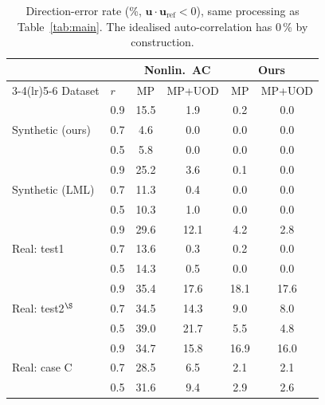 \begin{table}[t]
\centering
\caption{Direction-error rate (\%, $\mathbf{u}\cdot\mathbf{u}_\mathrm{ref}<0$), same processing as Table~\ref{tab:main}. The idealised auto-correlation has 0\,\% by construction.}
\label{tab:direction}
\small
\begin{tabular}{llcccc}
\toprule
 & & \multicolumn{2}{c}{Nonlin.\ AC} & \multicolumn{2}{c}{Ours} \\
\cmidrule(lr){3-4}\cmidrule(lr){5-6}
Dataset & $r$ & MP & MP+UOD & MP & MP+UOD \\
\midrule
\multirow{3}{*}{Synthetic (ours)} & 0.9 & 15.5 & 1.9 & 0.2 & 0.0 \\
 & 0.7 & 4.6 & 0.0 & 0.0 & 0.0 \\
 & 0.5 & 5.8 & 0.0 & 0.0 & 0.0 \\
\midrule
\multirow{3}{*}{Synthetic (LML)} & 0.9 & 25.2 & 3.6 & 0.1 & 0.0 \\
 & 0.7 & 11.3 & 0.4 & 0.0 & 0.0 \\
 & 0.5 & 10.3 & 1.0 & 0.0 & 0.0 \\
\midrule
\multirow{3}{*}{Real: test1} & 0.9 & 29.6 & 12.1 & 4.2 & 2.8 \\
 & 0.7 & 13.6 & 0.3 & 0.2 & 0.0 \\
 & 0.5 & 14.3 & 0.5 & 0.0 & 0.0 \\
\midrule
\multirow{3}{*}{Real: test2$^\S$} & 0.9 & 35.4 & 17.6 & 18.1 & 17.6 \\
 & 0.7 & 34.5 & 14.3 & 9.0 & 8.0 \\
 & 0.5 & 39.0 & 21.7 & 5.5 & 4.8 \\
\midrule
\multirow{3}{*}{Real: case C} & 0.9 & 34.7 & 15.8 & 16.9 & 16.0 \\
 & 0.7 & 28.5 & 6.5 & 2.1 & 2.1 \\
 & 0.5 & 31.6 & 9.4 & 2.9 & 2.6 \\
\bottomrule
\end{tabular}
\end{table}
